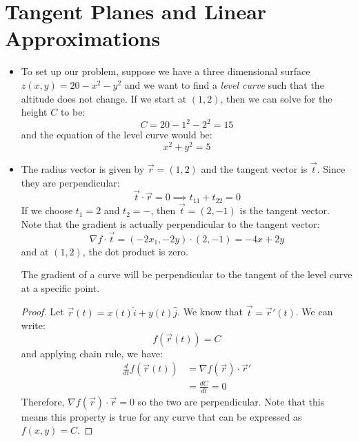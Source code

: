 \section{Tangent Planes and Linear Approximations}
\begin{itemize}
    \item To set up our problem, suppose we have a three dimensional surface $z(x,y)=20-x^2-y^2$ and we want to find a \textit{level curve} such that the altitude does not change. If we start at $(1,2)$, then we can solve for the height $C$ to be:
    \begin{equation}
        C = 20-1^2-2^2 = 15
    \end{equation}
    and the equation of the level curve would be:
    \begin{equation}
        x^2 + y^2 = 5
    \end{equation}
    \item The radius vector is given by $\vec{r}=(1,2)$ and the tangent vector is $\vec{t}$. Since they are perpendicular:
    \begin{equation}
        \vec{t} \cdot \vec{r} = 0 \implies t_11+t_22 = 0
    \end{equation}
    If we choose $t_1=2$ and $t_2=-$, then $\vec{t} = (2,-1)$ is the tangent vector. Note that the gradient is actually perpendicular to the tangent vector:
    \begin{equation}
        \nabla f \cdot \vec{t} = (-2x_1, - 2y) \cdot (2,-1) = -4x+2y
    \end{equation}
    and at $(1,2)$, the dot product is zero.
    \begin{theorem}
        The gradient of a curve will be perpendicular to the tangent of the level curve at a specific point.
        \begin{proof}
            Let $\vec{r}(t)=x(t)\hat{i}+y(t)\hat{j}$. We know that $\vec{t}=\vec{r}'(t)$. We can write:
            \begin{equation}
                f(\vec{r}(t)) = C
            \end{equation}
            and applying chain rule, we have:
            \begin{align}
                \frac{d}{dt} f(\vec{r}(t)) &= \nabla f(\vec{r})\cdot \vec{r}' \\ 
                &= \frac{dC}{dt} = 0
            \end{align}
            Therefore, $\nabla f(\vec{r}) \cdot \vec{r} = 0$ so the two are perpendicular. Note that this means this property is true for any curve that can be expressed as $f(x,y)=C$.

\end{proof}
\end{theorem}
\end{itemize}
